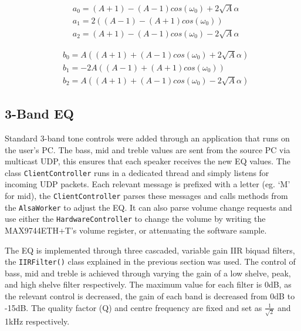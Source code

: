 \documentclass[main.tex]{subfiles}
\begin{document}
\begin{center}
    \begin{minipage}{.5\linewidth}
        \begin{equation*}
            \begin{aligned} 
                &a_0 = (A + 1) - (A - 1)cos(\omega_ 0) + 2\sqrt{A} \alpha \\
                &a_1 = 2((A - 1) - (A + 1)cos(\omega_ 0)) \\
                &a_2 = (A + 1) - (A - 1)cos(\omega_ 0) - 2\sqrt{A} \alpha
            \end{aligned}
        \end{equation*}
        \end{minipage}%
        \begin{minipage}{.5\linewidth}
        \begin{equation*}
            \begin{aligned}
                &b_0 = A((A + 1) + (A - 1)cos(\omega _0) + 2\sqrt{A} \alpha) \\
                &b_1 = -2A((A - 1) + (A + 1)cos(\omega _0)) \\
                &b_2 = A((A + 1) + (A - 1)cos(\omega_ 0) - 2\sqrt{A} \alpha)
            \end{aligned}
        \end{equation*}
    \end{minipage}
    \end{center}

\medskip 


\subsection{3-Band EQ}
Standard 3-band tone controls were added through an application that runs on the user's PC.
The bass, mid and treble values are sent from the source PC via multicast UDP, this ensures that each speaker receives the new EQ values.
The class \lstinline{ClientController} runs in a dedicated thread and simply listens for incoming UDP packets. 
Each relevant message is prefixed with a letter (eg. `M' for mid), the \lstinline{ClientController} parses these messages and calls methods from the \lstinline{AlsaWorker} to adjust the EQ.
It can also parse volume change requests and use either the \lstinline{HardwareController} to change the volume by writing the MAX9744ETH+T's volume register, or attenuating the software sample. 

\medskip
The EQ is implemented through three cascaded, variable gain IIR biquad filters, the \lstinline{IIRFilter()} class explained in the previous section was used. 
The control of bass, mid and treble is achieved through varying the gain of a low shelve, peak, and high shelve filter respectively. 
The maximum value for each filter is 0dB, as the relevant control is decreased, the gain of each band is decreased from 0dB to -15dB. 
The quality factor (Q) and centre frequency are fixed and set as $\frac{1}{\sqrt{2}}$ and 1kHz respectively.
\end{document}
